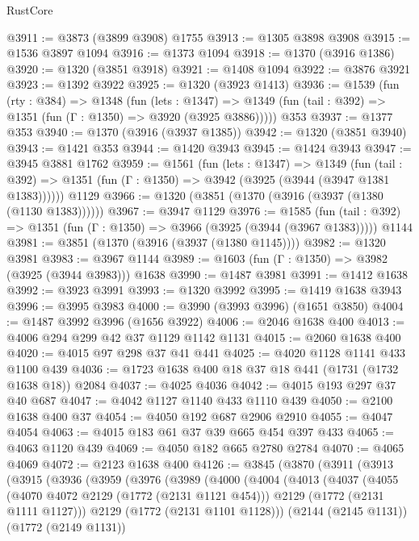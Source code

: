 \begin{lexlean}{RustCore}
\begin{coremodule}
@3911 := @3873 (@3899 @3908) @1755
@3913 := @1305 @3898 @3908
@3915 := @1536 @3897 @1094
@3916 := @1373 @1094
@3918 := @1370 (@3916 @1386)
@3920 := @1320 (@3851 @3918)
@3921 := @1408 @1094
@3922 := @3876 @3921
@3923 := @1392 @3922
@3925 := @1320 (@3923 @1413)
@3936 := @1539
    (fun (rty : @384) =>
    @1348
      (fun (lets : @1347) =>
      @1349 (fun (tail : @392) => @1351 (fun (Γ : @1350) => @3920 (@3925 @3886)))))
    @353
@3937 := @1377 @353
@3940 := @1370 (@3916 (@3937 @1385))
@3942 := @1320 (@3851 @3940)
@3943 := @1421 @353
@3944 := @1420 @3943
@3945 := @1424 @3943
@3947 := @3945 @3881 @1762
@3959 := @1561
    (fun (lets : @1347) =>
    @1349
      (fun (tail : @392) => @1351 (fun (Γ : @1350) => @3942 (@3925 (@3944 (@3947 @1381 @1383))))))
    @1129
@3966 := @1320 (@3851 (@1370 (@3916 (@3937 (@1380 (@1130 @1383))))))
@3967 := @3947 @1129
@3976 := @1585
    (fun (tail : @392) => @1351 (fun (Γ : @1350) => @3966 (@3925 (@3944 (@3967 @1383)))))
    @1144
@3981 := @3851 (@1370 (@3916 (@3937 (@1380 @1145))))
@3982 := @1320 @3981
@3983 := @3967 @1144
@3989 := @1603 (fun (Γ : @1350) => @3982 (@3925 (@3944 @3983))) @1638
@3990 := @1487 @3981
@3991 := @1412 @1638
@3992 := @3923 @3991
@3993 := @1320 @3992
@3995 := @1419 @1638 @3943
@3996 := @3995 @3983
@4000 := @3990 (@3993 @3996) (@1651 @3850)
@4004 := @1487 @3992 @3996 (@1656 @3922)
@4006 := @2046 @1638 @400
@4013 := @4006 @294 @299 @42 @37 @1129 @1142 @1131
@4015 := @2060 @1638 @400
@4020 := @4015 @97 @298 @37 @41 @441
@4025 := @4020 @1128 @1141 @433 @1100 @439
@4036 := @1723 @1638 @400 @18 @37 @18 @441 (@1731 (@1732 @1638 @18)) @2084
@4037 := @4025 @4036
@4042 := @4015 @193 @297 @37 @40 @687
@4047 := @4042 @1127 @1140 @433 @1110 @439
@4050 := @2100 @1638 @400 @37
@4054 := @4050 @192 @687 @2906 @2910
@4055 := @4047 @4054
@4063 := @4015 @183 @61 @37 @39 @665 @454 @397 @433
@4065 := @4063 @1120 @439
@4069 := @4050 @182 @665 @2780 @2784
@4070 := @4065 @4069
@4072 := @2123 @1638 @400
@4126 := @3845
    (@3870
      (@3911
        (@3913
          (@3915
            (@3936
              (@3959
                (@3976
                  (@3989
                    (@4000
                      (@4004
                        (@4013
                          (@4037
                            (@4055
                              (@4070 @4072 @2129 (@1772 (@2131 @1121 @454)))
                              @2129
                              (@1772 (@2131 @1111 @1127)))
                            @2129
                            (@1772 (@2131 @1101 @1128)))
                          (@2144 (@2145 @1131))
                          (@1772 (@2149 @1131))

\end{coremodule}
\end{lexlean}
